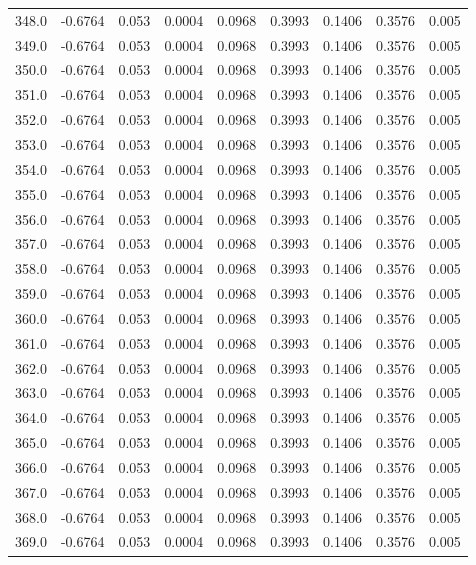 \begin{longtable}{lrrrrrrrr}
348.0 & -0.6764 & 0.053 & 0.0004 & 0.0968 & 0.3993 & 0.1406 & 0.3576 & 0.005 \\
349.0 & -0.6764 & 0.053 & 0.0004 & 0.0968 & 0.3993 & 0.1406 & 0.3576 & 0.005 \\
350.0 & -0.6764 & 0.053 & 0.0004 & 0.0968 & 0.3993 & 0.1406 & 0.3576 & 0.005 \\
351.0 & -0.6764 & 0.053 & 0.0004 & 0.0968 & 0.3993 & 0.1406 & 0.3576 & 0.005 \\
352.0 & -0.6764 & 0.053 & 0.0004 & 0.0968 & 0.3993 & 0.1406 & 0.3576 & 0.005 \\
353.0 & -0.6764 & 0.053 & 0.0004 & 0.0968 & 0.3993 & 0.1406 & 0.3576 & 0.005 \\
354.0 & -0.6764 & 0.053 & 0.0004 & 0.0968 & 0.3993 & 0.1406 & 0.3576 & 0.005 \\
355.0 & -0.6764 & 0.053 & 0.0004 & 0.0968 & 0.3993 & 0.1406 & 0.3576 & 0.005 \\
356.0 & -0.6764 & 0.053 & 0.0004 & 0.0968 & 0.3993 & 0.1406 & 0.3576 & 0.005 \\
357.0 & -0.6764 & 0.053 & 0.0004 & 0.0968 & 0.3993 & 0.1406 & 0.3576 & 0.005 \\
358.0 & -0.6764 & 0.053 & 0.0004 & 0.0968 & 0.3993 & 0.1406 & 0.3576 & 0.005 \\
359.0 & -0.6764 & 0.053 & 0.0004 & 0.0968 & 0.3993 & 0.1406 & 0.3576 & 0.005 \\
360.0 & -0.6764 & 0.053 & 0.0004 & 0.0968 & 0.3993 & 0.1406 & 0.3576 & 0.005 \\
361.0 & -0.6764 & 0.053 & 0.0004 & 0.0968 & 0.3993 & 0.1406 & 0.3576 & 0.005 \\
362.0 & -0.6764 & 0.053 & 0.0004 & 0.0968 & 0.3993 & 0.1406 & 0.3576 & 0.005 \\
363.0 & -0.6764 & 0.053 & 0.0004 & 0.0968 & 0.3993 & 0.1406 & 0.3576 & 0.005 \\
364.0 & -0.6764 & 0.053 & 0.0004 & 0.0968 & 0.3993 & 0.1406 & 0.3576 & 0.005 \\
365.0 & -0.6764 & 0.053 & 0.0004 & 0.0968 & 0.3993 & 0.1406 & 0.3576 & 0.005 \\
366.0 & -0.6764 & 0.053 & 0.0004 & 0.0968 & 0.3993 & 0.1406 & 0.3576 & 0.005 \\
367.0 & -0.6764 & 0.053 & 0.0004 & 0.0968 & 0.3993 & 0.1406 & 0.3576 & 0.005 \\
368.0 & -0.6764 & 0.053 & 0.0004 & 0.0968 & 0.3993 & 0.1406 & 0.3576 & 0.005 \\
369.0 & -0.6764 & 0.053 & 0.0004 & 0.0968 & 0.3993 & 0.1406 & 0.3576 & 0.005 \\

\end{longtable}
